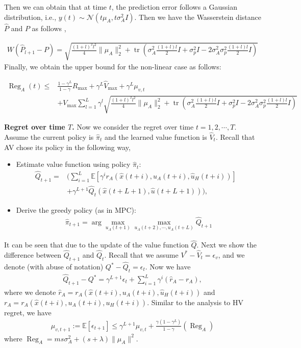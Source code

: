 Then we can obtain that at time $t$, the prediction error follows a Gaussian distribution, i.e., $y(t) \sim \mathcal{N}(t\mu_A, t\sigma_A^2   I)$.  Then we have the Wasserstein distance $\hat{P}$ and $P$ as follows \cite{delon2020wasserstein},

\begin{align*}
   W(\hat{{P}}_{l+1}-P) = \sqrt{\frac{(1+l)^2l^2}{4}\|\mu_A\|^2_2 + \operatorname{tr}\left( \sigma_A^2 \frac{(1+l)l}{2}I + \sigma_p^2 I -2\sigma_A^2\sigma_p^2 \frac{(1+l)l}{2} I \right)}
\end{align*}
Finally, we obtain the upper bound for the non-linear case as follows:

\begin{align*}
     \operatorname{Reg}_A(t) \leq & \frac{1-\gamma^L}{1-\gamma}R_{\max}+\gamma^L \hat{V}_{\max} + \gamma^L \mu_{v,t}\\
     &+ V_{\max} \sum_{l=1}^L \gamma^l \sqrt{\frac{(1+l)^2l^2}{4}\|\mu_A\|^2_2 + \operatorname{tr}\left( \sigma_A^2 \frac{(1+l)l}{2}I + \sigma_p^2 I -2\sigma_A^2\sigma_p^2 \frac{(1+l)l}{2} I \right)}
\end{align*}


{\bf Regret over time $T$.} Now we consider the regret over time $t=1,2,\cdots,T$. Assume the current policy is $\hat{\pi}_t$ and the learned value function is $\hat{V}_t$. Recall that AV chose its policy in the following way,
\begin{itemize}
    \item Estimate value function using policy $\hat{\pi}_t$: 
    \begin{align*}
        \hat{Q}_{t+1} =& \Biggl( \sum_{i=1}^{L} \mathbb{E} \left[\gamma^i r_A(\hat{x}(t+i),u_A(t+i),\hat{u}_H(t+i))\right] &\\
        & + \gamma^{L+1} \hat{Q}_t(\hat{x}(t+L+1),\hat{u}(t+L+1)) \Biggl),
    \end{align*}   
    \item Derive the greedy policy (as in MPC):
    \begin{align*}
        \hat{\pi}_{t+1} = \arg \max_{u_A(t+1)} \max_{u_A(t+2),\cdots,u_A(t+L)} \hat{Q}_{t+1} 
    \end{align*}
\end{itemize}
It can be seen that due to the update of the value function $\hat{Q}$. Next we show the difference between $\hat{Q}_{t+1}$ and $\hat{Q}_{t}$. Recall that we assume $V^{*}-\hat{V}_t = \epsilon_v$, and we denote (with abuse of notation) $Q^{*}-\hat{Q}_t = \epsilon_{t}$. Now we have
\begin{align*}
    \hat{Q}_{t+1} - Q^{*} = \gamma^{L+1}\epsilon_t + \sum_{i=1}^L \gamma^i(\hat{r}_A-r_A),
\end{align*}
where we denote $\hat{r}_A = r_A(\hat{x}(t+i),u_A(t+i),\hat{u}_H(t+i))$ and $r_A = r_A(\hat{x}(t+i),u_A(t+i),{u}_H(t+i))$. Similar to the analysis to HV regret, we have 
\begin{align*}
  \mu_{v,t+1}:= \mathbb{E} [ \epsilon_{t+1}] \leq \gamma^{L+1}\mu_{v,t} + \frac{\gamma(1-\gamma^L)}{1-\gamma}(\operatorname{Reg}_A)
\end{align*}
where $\operatorname{Reg}_A = ms\sigma_A^2 + (s+\lambda)\|\mu_A\|^2$.

